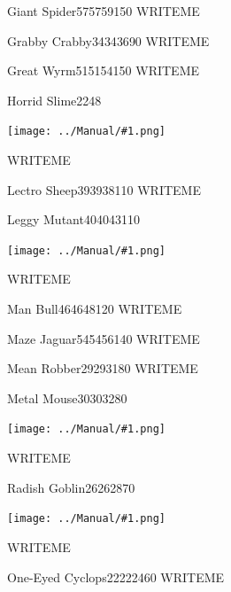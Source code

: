 \documentclass[10pt,twocolumn]{memoir}
\newcommand\pic[1]{%
  \begin{center}
    \texttt{[image: ../Manual/\#1.png]}
  \end{center}}
\begin{document}
\begin{monsterpage}{Giant Spider}{57}{57}{59}{150}
  WRITEME
\end{monsterpage}

\begin{monsterpage}{Grabby Crabby}{34}{34}{36}{90}
  WRITEME
\end{monsterpage}

\begin{monsterpage}{Great Wyrm}{51}{51}{54}{150}
  WRITEME
\end{monsterpage}

\begin{monsterpage}{Horrid Slime}{2}{2}{4}{8}
  \pic{Horrid-Slime}
  
  WRITEME
\end{monsterpage}

\begin{monsterpage}{Lectro Sheep}{39}{39}{38}{110}
  WRITEME
\end{monsterpage}

\begin{monsterpage}{Leggy Mutant}{40}{40}{43}{110}
  \pic{Leggy-Mutant}
  
  WRITEME
\end{monsterpage}

\begin{monsterpage}{Man Bull}{46}{46}{48}{120}
  WRITEME
\end{monsterpage}

\begin{monsterpage}{Maze Jaguar}{54}{54}{56}{140}
  WRITEME
\end{monsterpage}

\begin{bosspage}{Mean Robber}{29}{29}{31}{80}
  WRITEME
\end{bosspage}

\begin{monsterpage}{Metal Mouse}{30}{30}{32}{80}
  \pic{Metal-Mouse}
  
  WRITEME
\end{monsterpage}

\begin{monsterpage}{Radish Goblin}{26}{26}{28}{70}
  \pic{Radish-Goblin}
  
  WRITEME
\end{monsterpage}

\begin{bosspage}{One-Eyed Cyclops}{22}{22}{24}{60}
  WRITEME
\end{bosspage}
\end{document}
